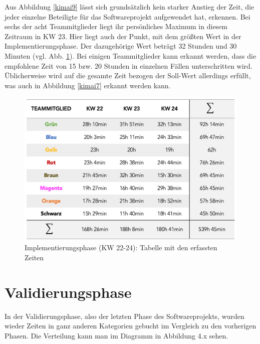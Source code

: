 \documentclass[../review_3.tex]{subfiles}
\begin{document}
Aus Abbildung \ref{kimai9} lässt sich grundsätzlich kein starker Anstieg der Zeit, die jeder einzelne Beteiligte für das Softwareprojekt aufgewendet hat, erkennen. Bei sechs der acht Teammitglieder liegt ihr persönliches Maximum in diesem Zeitraum in KW 23. Hier liegt auch der Punkt, mit dem größten Wert in der Implementierungsphase. Der dazugehörige Wert beträgt 32 Stunden und 30 Minuten (vgl. Abb. \ref{kimai11}).
Bei einigen Teammitglieder kann erkannt werden, dass die empfohlene Zeit von 15 bzw. 20 Stunden in einzelnen Fällen unterschritten wird. Üblicherweise wird auf die gesamte Zeit bezogen der Soll-Wert allerdings erfüllt, was  auch in Abbildung \ref{kimai7} erkannt werden kann.

\begin{figure} [h]
    \centering
    \includegraphics[width = 0.8\linewidth]{img/kimai11.png}
    \caption{Implementierungsphase (KW 22-24): Tabelle mit den erfassten Zeiten}
    \label{kimai11}
\end{figure}

\section{Validierungsphase}

In der Validierungsphase, also der letzten Phase des Softwareprojekts, wurden wieder Zeiten in ganz anderen Kategorien gebucht im Vergleich zu den vorherigen Phasen. Die Verteilung kann man im Diagramm in Abbildung 4.x sehen.
\end{document}
